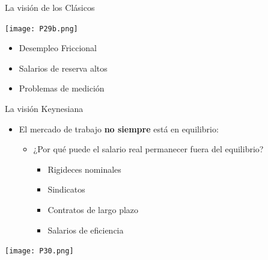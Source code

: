 \documentclass{beamer}
\begin{document}





\begin{frame}{La visión de los Clásicos}

    \centering\texttt{[image: P29b.png]}\

\begin{itemize}
    \item Desempleo Friccional
\item Salarios de reserva altos
\item Problemas de medición
   
\end{itemize}
\end{frame}
\begin{frame}{La visión Keynesiana}

\begin{itemize}
    \footnotesize\item El mercado de trabajo \textbf{no siempre} está en equilibrio:
    \vspace{2mm}
    \begin{itemize}
    \scriptsize\item ¿Por qué puede el salario real permanecer fuera del equilibrio?
    \begin{itemize}
        \scriptsize\item Rigideces nominales
        \scriptsize\item Sindicatos
        \scriptsize\item Contratos de largo plazo
        \scriptsize\item Salarios de eficiencia
       \end{itemize}
    \end{itemize}
\end{itemize}

    \centering\texttt{[image: P30.png]}\

\end{frame}
\end{document}
